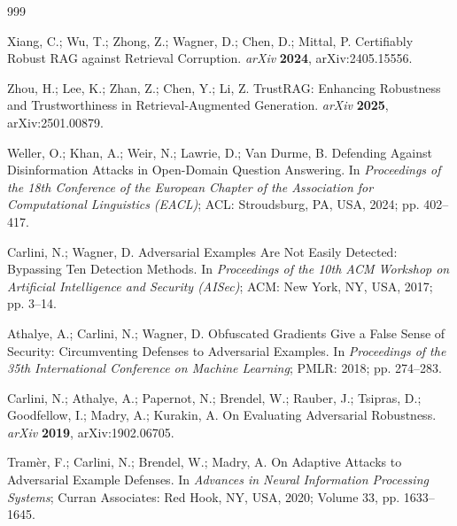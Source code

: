 \begin{thebibliography}{999}

Xiang, C.; Wu, T.; Zhong, Z.; Wagner, D.; Chen, D.; Mittal, P. Certifiably Robust RAG against
Retrieval Corruption. \textit{arXiv} \textbf{2024}, arXiv:2405.15556.

Zhou, H.; Lee, K.; Zhan, Z.; Chen, Y.; Li, Z. TrustRAG: Enhancing Robustness and
Trustworthiness in Retrieval-Augmented Generation. \textit{arXiv} \textbf{2025},
arXiv:2501.00879.

Weller, O.; Khan, A.; Weir, N.; Lawrie, D.; Van Durme, B. Defending Against Disinformation
Attacks in Open-Domain Question Answering. In \textit{Proceedings of the 18th Conference of the
European Chapter of the Association for Computational Linguistics (EACL)}; ACL: Stroudsburg,
PA, USA, 2024; pp. 402--417.


Carlini, N.; Wagner, D. Adversarial Examples Are Not Easily Detected: Bypassing Ten Detection
Methods. In \textit{Proceedings of the 10th ACM Workshop on Artificial Intelligence and
Security (AISec)}; ACM: New York, NY, USA, 2017; pp. 3--14.

Athalye, A.; Carlini, N.; Wagner, D. Obfuscated Gradients Give a False Sense of Security:
Circumventing Defenses to Adversarial Examples. In \textit{Proceedings of the 35th
International Conference on Machine Learning}; PMLR: 2018; pp. 274--283.

Carlini, N.; Athalye, A.; Papernot, N.; Brendel, W.; Rauber, J.; Tsipras, D.; Goodfellow, I.;
Madry, A.; Kurakin, A. On Evaluating Adversarial Robustness. \textit{arXiv} \textbf{2019},
arXiv:1902.06705.

Tram\`er, F.; Carlini, N.; Brendel, W.; Madry, A. On Adaptive Attacks to Adversarial Example
Defenses. In \textit{Advances in Neural Information Processing Systems}; Curran Associates: Red
Hook, NY, USA, 2020; Volume 33, pp. 1633--1645.



\end{thebibliography}
